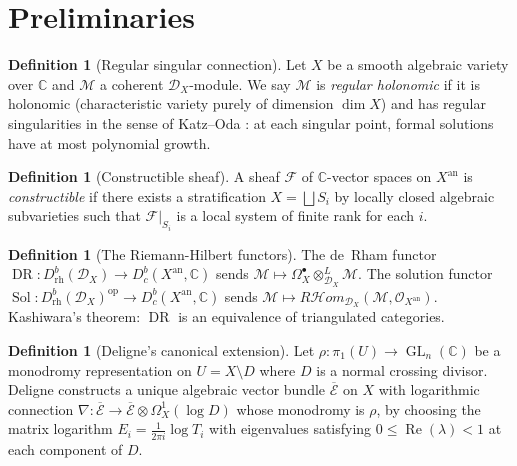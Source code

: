 \documentclass[11pt,a4paper]{article}
\theoremstyle{plain}
\theoremstyle{definition}
\newtheorem{definition}[theorem]{Definition}
\newcommand{\C}{\mathbb{C}}
\DeclareMathOperator{\GL}{GL}
\DeclareMathOperator{\DR}{DR}
\DeclareMathOperator{\Sol}{Sol}
\renewcommand{\Re}{\operatorname{Re}}
\begin{document}
\section{Preliminaries}

\begin{definition}[Regular singular connection]
Let $X$ be a smooth algebraic variety over $\C$ and $\mathcal{M}$ a coherent $\mathcal{D}_X$-module.
We say $\mathcal{M}$ is \emph{regular holonomic} if it is holonomic (characteristic variety purely of dimension $\dim X$) and has regular singularities in the sense of Katz--Oda \cite{Katz1970}: at each singular point, formal solutions have at most polynomial growth.
\end{definition}

\begin{definition}[Constructible sheaf]
A sheaf $\mathcal{F}$ of $\C$-vector spaces on $X^{\mathrm{an}}$ is \emph{constructible} if there exists a stratification $X = \bigsqcup S_i$ by locally closed algebraic subvarieties such that $\mathcal{F}|_{S_i}$ is a local system of finite rank for each $i$.
\end{definition}

\begin{definition}[The Riemann-Hilbert functors]
The de~Rham functor $\DR : D^b_{\mathrm{rh}}(\mathcal{D}_X) \to D^b_c(X^{\mathrm{an}}, \C)$ sends $\mathcal{M} \mapsto \Omega^\bullet_X \otimes^L_{\mathcal{D}_X} \mathcal{M}$.
The solution functor $\Sol : D^b_{\mathrm{rh}}(\mathcal{D}_X)^{\mathrm{op}} \to D^b_c(X^{\mathrm{an}}, \C)$ sends $\mathcal{M} \mapsto R\mathcal{H}om_{\mathcal{D}_X}(\mathcal{M}, \mathcal{O}_{X^{\mathrm{an}}})$.
Kashiwara's theorem: $\DR$ is an equivalence of triangulated categories.
\end{definition}

\begin{definition}[Deligne's canonical extension]
Let $\rho : \pi_1(U) \to \GL_n(\C)$ be a monodromy representation on $U = X \setminus D$ where $D$ is a normal crossing divisor.
Deligne constructs a unique algebraic vector bundle $\overline{\mathcal{E}}$ on $X$ with logarithmic connection $\nabla : \overline{\mathcal{E}} \to \overline{\mathcal{E}} \otimes \Omega^1_X(\log D)$ whose monodromy is $\rho$, by choosing the matrix logarithm $E_i = \frac{1}{2\pi i} \log T_i$ with eigenvalues satisfying $0 \le \Re(\lambda) < 1$ at each component of $D$.
\end{definition}
\end{document}
